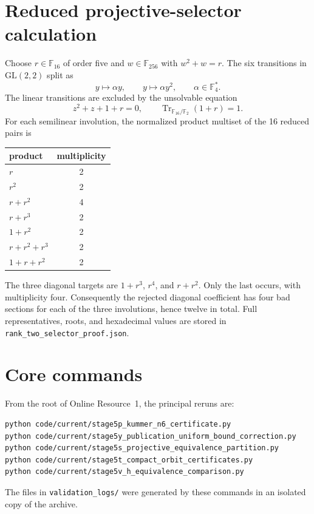 \documentclass[pdflatex,sn-mathphys-num]{sn-jnl}
\newcommand{\F}{\mathbb F}
\newcommand{\Tr}{\operatorname{Tr}}
\begin{document}
\section{Reduced projective-selector calculation}

Choose $r\in\F_{16}$ of order five and $w\in\F_{256}$ with $w^2+w=r$.  The six transitions in $\mathrm{GL}(2,2)$ split as
\[
 y\longmapsto\alpha y,
 \qquad
 y\longmapsto\alpha y^2,
 \qquad \alpha\in\F_4^*.
\]
The linear transitions are excluded by the unsolvable equation
\[
 z^2+z+1+r=0,
 \qquad \Tr_{\F_{16}/\F_2}(1+r)=1.
\]
For each semilinear involution, the normalized product multiset of the 16 reduced pairs is
\begin{center}
\begin{tabular}{@{}lc@{}}
\toprule
product & multiplicity\\
\midrule
$r$ & 2\\
$r^2$ & 2\\
$r+r^2$ & 4\\
$r+r^3$ & 2\\
$1+r^2$ & 2\\
$r+r^2+r^3$ & 2\\
$1+r+r^2$ & 2\\
\bottomrule
\end{tabular}
\end{center}
The three diagonal targets are $1+r^3$, $r^4$, and $r+r^2$.  Only the last occurs, with multiplicity four.  Consequently the rejected diagonal coefficient has four bad sections for each of the three involutions, hence twelve in total.  Full representatives, roots, and hexadecimal values are stored in \nolinkurl{rank_two_selector_proof.json}.

\section{Core commands}

From the root of Online Resource~1, the principal reruns are:
\begin{verbatim}
python code/current/stage5p_kummer_n6_certificate.py
python code/current/stage5y_publication_uniform_bound_correction.py
python code/current/stage5s_projective_equivalence_partition.py
python code/current/stage5t_compact_orbit_certificates.py
python code/current/stage5v_h_equivalence_comparison.py
\end{verbatim}
The files in \texttt{validation\_logs/} were generated by these commands in an isolated copy of the archive.
\end{document}
